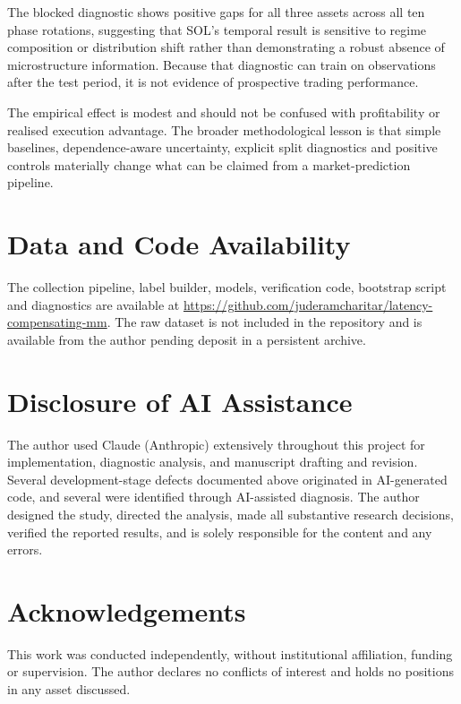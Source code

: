 \documentclass[11pt]{article}
\begin{document}
The blocked diagnostic shows positive gaps for all three assets across all ten
phase rotations, suggesting that SOL's temporal result is sensitive to regime
composition or distribution shift rather than demonstrating a robust absence of
microstructure information. Because that diagnostic can train on observations
after the test period, it is not evidence of prospective trading performance.

The empirical effect is modest and should not be confused with profitability or
realised execution advantage. The broader methodological lesson is that simple
baselines, dependence-aware uncertainty, explicit split diagnostics and positive
controls materially change what can be claimed from a market-prediction
pipeline.

\section*{Data and Code Availability}

The collection pipeline, label builder, models, verification code, bootstrap
script and diagnostics are available at
\url{https://github.com/juderamcharitar/latency-compensating-mm}. The raw dataset
is not included in the repository and is available from the author pending
deposit in a persistent archive.

\section*{Disclosure of AI Assistance}

The author used Claude (Anthropic) extensively throughout this project for
implementation, diagnostic analysis, and manuscript drafting and revision.
Several development-stage defects documented above originated in AI-generated
code, and several were identified through AI-assisted diagnosis. The author
designed the study, directed the analysis, made all substantive research
decisions, verified the reported results, and is solely responsible for the
content and any errors.

\section*{Acknowledgements}

This work was conducted independently, without institutional affiliation,
funding or supervision. The author declares no conflicts of interest and holds
no positions in any asset discussed.


\end{document}
